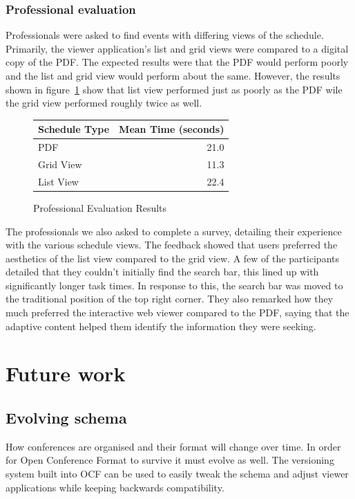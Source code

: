 \documentclass[conference]{IEEEtran}
\begin{document}
\subsubsection{Professional evaluation}
Professionals were asked to find events with differing views of the schedule. Primarily, the viewer application's list and grid views were compared to a digital copy of the PDF. The expected results were that the PDF would perform poorly and the list and grid view would perform about the same. However, the results shown in figure~\ref{fig:eval_results} show that list view performed just as poorly as the PDF wile the grid view performed roughly twice as well.

\begin{figure}[h]
  \centering
  \begin{tabular}{ l r }
    \hline
    Schedule Type & Mean Time (seconds) \\
    \hline
    PDF           & 21.0                \\
    Grid View     & 11.3                \\
    List View     & 22.4                \\
  \end{tabular}
  \caption{Professional Evaluation Results}
  \label{fig:eval_results}
\end{figure}

The professionals we also asked to complete a survey, detailing their experience with the various schedule views. The feedback showed that users preferred the aesthetics of the list view compared to the grid view. A few of the participants detailed that they couldn't initially find the search bar, this lined up with significantly longer task times. In response to this, the search bar was moved to the traditional position of the top right corner. They also remarked how they much preferred the interactive web viewer compared to the PDF, saying that the adaptive content helped them identify the information they were seeking.

\section{Future work}

\subsection{Evolving schema}
How conferences are organised and their format will change over time. In order for Open Conference Format to survive it must evolve as well. The versioning system built into OCF can be used to easily tweak the schema and adjust viewer applications while keeping backwards compatibility.
\end{document}

